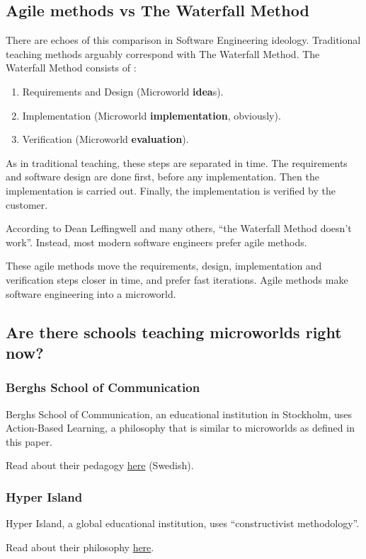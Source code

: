 \subsection{Agile methods vs The Waterfall Method}

There are echoes of this comparison in Software Engineering ideology.
Traditional teaching methods arguably correspond with The Waterfall
Method. The Waterfall Method consists of \cite{wiki:waterfall}: 

\begin{enumerate}
\item Requirements and Design (Microworld \textbf{idea}s). 
\item Implementation (Microworld \textbf{implementation}, obviously). 
\item Verification (Microworld \textbf{evaluation}).
\end{enumerate}

As in traditional teaching, these steps are separated in time. The
requirements and software design are done first, before any
implementation. Then the implementation is carried out. Finally, the
implementation is verified by the customer.

According to Dean Leffingwell and many others, ``the Waterfall Method
doesn't work''\cite{leffingwell}. Instead, most modern software engineers
prefer agile methods.

These agile methods move the requirements, design, implementation and
verification steps closer in time, and prefer fast iterations. Agile
methods make software engineering into a microworld.

\subsection{Are there schools teaching microworlds right now?}

\subsubsection{Berghs School of Communication}

Berghs School of Communication, an educational institution in Stockholm, uses Action-Based Learning, a philosophy that is similar to microworlds as defined in this paper.

Read about their pedagogy \href{http://www.berghs.se/content/berghs-pedagogik}{here} (Swedish). 

\subsubsection{Hyper Island}

Hyper Island, a global educational institution, uses ``constructivist methodology''.

Read about their philosophy \href{http://www.hyperisland.com/singapore/sgma/philosophy}{here}.
